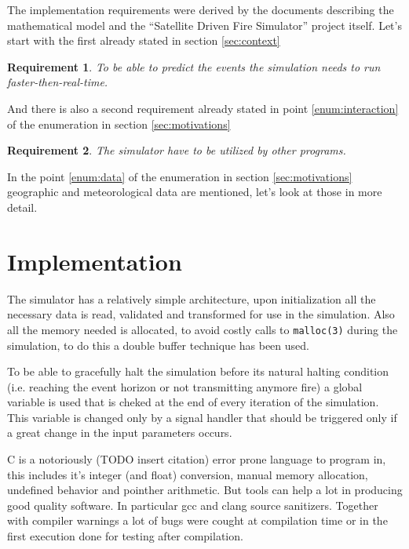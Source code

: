 \documentclass{article}
\newtheorem{requirement}{Requirement}
\begin{document}
The implementation requirements were derived by the documents describing the
mathematical model and the ``Satellite Driven Fire Simulator'' project itself.
Let's start with the first already stated in section \ref{sec:context}

\begin{requirement}\label{thm:faster}
To be able to predict the events the simulation needs to run
faster-then-real-time.
\end{requirement}

And there is also a second requirement already stated in point
\ref{enum:interaction} of the enumeration in section \ref{sec:motivations}

\begin{requirement}\label{thm:used}
The simulator have to be utilized by other programs.
\end{requirement}

In the point \ref{enum:data} of the enumeration in section \ref{sec:motivations}
geographic and meteorological data are mentioned, let's look at those in more
detail.


\section{Implementation}\label{sec:implementation}

The simulator has a relatively simple architecture, upon initialization all the
necessary data is read, validated and transformed for use in the simulation.
Also all the memory needed is allocated, to avoid costly calls to
\texttt{malloc(3)} during the simulation, to do this a double buffer technique
has been used.


To be able to gracefully halt the simulation before its natural halting
condition (i.e. reaching the event horizon or not transmitting anymore fire) a
global variable is used that is cheked at the end of every iteration of the
simulation. This variable is changed only by a signal handler that should be
triggered only if a great change in the input parameters occurs.

C is a notoriously (TODO insert citation) error prone language to program in,
this includes it's integer (and float) conversion, manual memory allocation,
undefined behavior and pointher arithmetic. But tools can help a lot in
producing good quality software. In particular gcc and clang source sanitizers.
Together with compiler warnings a lot of bugs were cought at compilation time or
in the first execution done for testing after compilation.
\end{document}

